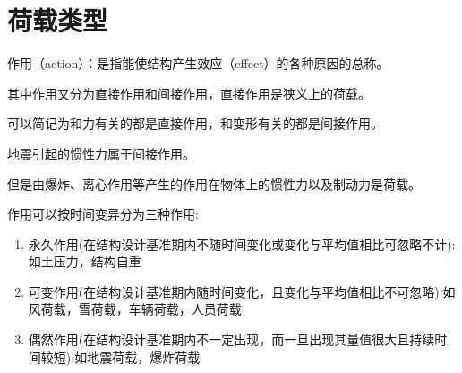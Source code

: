 \documentclass[12pt, a4paper, oneside, UTF8]{ctexbook}
\begin{document}
% 
\else
\fi

\chapter{荷载类型}

\begin{definition}
    作用（action）：是指能使结构产生效应（effect）的各种原因的总称。

    其中作用又分为直接作用和间接作用，{\color{red}直接作用是狭义上的荷载}。

    可以简记为和力有关的都是直接作用，和变形有关的都是间接作用。
\end{definition}

\begin{example}
    地震引起的惯性力属于间接作用。

    但是由爆炸、离心作用等产生的作用在物体上的惯性力以及制动力是荷载。
\end{example}

\begin{definition}
    作用可以按时间变异分为三种作用:
    \begin{enumerate}
        \item 永久作用(在结构设计基准期内不随时间变化或变化与平均值相比可忽略不计):如土压力，结构自重
        \item 可变作用(在结构设计基准期内随时间变化，且变化与平均值相比不可忽略):如风荷载，雪荷载，车辆荷载，人员荷载
        \item 偶然作用(在结构设计基准期内不一定出现，而一旦出现其量值很大且持续时间较短):如地震荷载，爆炸荷载
    \end{enumerate}
\end{definition}



\ifx\allfiles\undefined
\end{document}
